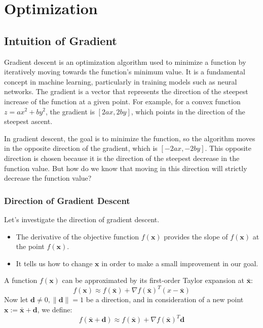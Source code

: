 \chapter{Optimization}
\label{ch:optimization}

\section{Intuition of Gradient}

Gradient descent is an optimization algorithm used to minimize a function by iteratively moving towards the function's minimum value. It is a fundamental concept in machine learning, particularly in training models such as neural networks. The gradient is a vector that represents the direction of the steepest increase of the function at a given point. For example, for a convex function $z = ax^2 + by^2$, the gradient is $[2ax, 2by]$, which points in the direction of the steepest ascent.

In gradient descent, the goal is to minimize the function, so the algorithm moves in the opposite direction of the gradient, which is $[-2ax, -2by]$. This opposite direction is chosen because it is the direction of the steepest decrease in the function value. But how do we know that moving in this direction will strictly decrease the function value?

\subsection{Direction of Gradient Descent}
Let's investigate the direction of gradient descent. 


\begin{itemize}
	\item The derivative of the objective function $f(\mathbf{x})$ provides the slope of $f(\mathbf{x})$ at the point $f(\mathbf{x})$.
	\item It tells us how to change $\mathbf{x}$ in order to make a small improvement in our goal.
\end{itemize}

A function $f(\mathbf{x})$ can be approximated by its first-order Taylor expansion at $\bar{\mathbf{x}}$:
$$f(\mathbf{x})\approx f(\bar{\mathbf{x}})+\nabla f(\bar{\mathbf{x}})^T(x-\bar{\mathbf{x}})$$
Now let $\mathbf{d}\neq0, \|\mathbf{d}\|=1$ be a direction, and in consideration of a new point $\mathbf{x}:=\bar{\mathbf{x}}+\mathbf{d}$, we define:
$$f(\bar{\mathbf{x}}+\mathbf{d})\approx f(\bar{\mathbf{x}})+\nabla f(\bar{\mathbf{x}})^T\mathbf{d}$$

